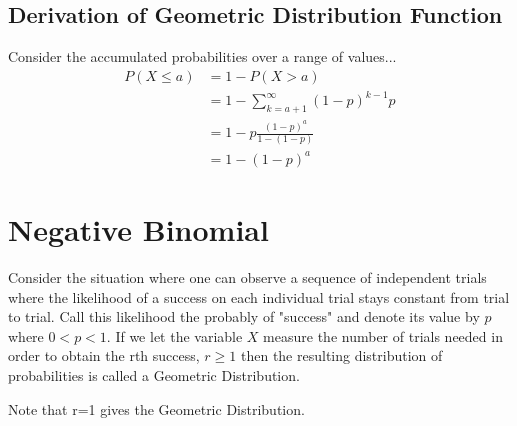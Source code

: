 \documentclass[10pt,]{book}
\theoremstyle{plain}
\theoremstyle{definition}
\theoremstyle{definition}
\numberwithin{equation}{section}
\newcommand{\lt}{ < }
\newcommand{\gt}{ > }
\begin{document}
\subsection[Derivation of Geometric Distribution Function]{Derivation of Geometric Distribution Function}\label{subsection-18}
 Consider the accumulated probabilities over a range of values...%
\begin{align*}
 P(X \le a) & = 1 - P(X \gt a)\\
 & = 1- \sum_{k={a+1}}^{\infty} {(1-p)^{k-1}p}\\
 & = 1- p \frac{(1-p)^{a}}{1-(1-p)}\\
 & = 1- (1-p)^{a}
\end{align*}\typeout{************************************************}
\typeout{************************************************}
\section[Negative Binomial]{Negative Binomial}\label{section-29}
Consider the situation where one can observe a sequence  of independent
	trials where the likelihood of a success on each individual trial
	stays constant from trial to trial. Call this likelihood the probably of
	"success" and denote its value by \(p\) 
	where \( 0 \lt p \lt 1 \).  
	If we let the variable \(X\) measure the number of trials needed in order
	to obtain the rth success, \(r \ge 1\) 
	then the resulting distribution of probabilities is called a 
	Geometric Distribution.%
\par
Note that r=1 gives the Geometric Distribution.%
\typeout{************************************************}
\typeout{************************************************}
\end{document}
